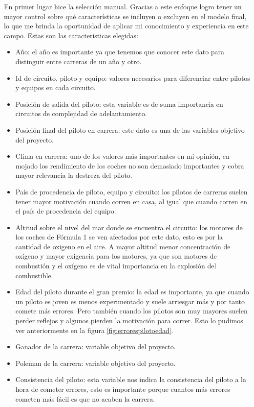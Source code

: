 En primer lugar hice la selección manual. Gracias a este enfoque logro tener un mayor control sobre qué características se incluyen o excluyen en el modelo final, lo que me brinda la oportunidad de aplicar mi conocimiento y experiencia en este campo. 
Estas son las características elegidas:

\begin{itemize}
    \item Año: el año es importante ya que tenemos que conocer este dato para distinguir entre carreras de un año y otro.
    \item Id de circuito, piloto y equipo: valores necesarios para diferenciar entre pilotos y equipos en cada circuito.
    \item Posición de salida del piloto: esta variable es de suma importancia en circuitos de complejidad de adelantamiento.
    \item Posición final del piloto en carrera: este dato es una de las variables objetivo del proyecto.
    \item Clima en carrera: uno de los valores más importantes en mi opinión, en mojado los rendimiento de los coches no son demasiado importantes y cobra mayor relevancia la destreza del piloto.
    \item País de procedencia de piloto, equipo y circuito: los pilotos de carreras suelen tener mayor motivación cuando corren en casa, al igual que cuando corren en el país de procedencia del equipo.
    \item Altitud sobre el nivel del mar donde se encuentra el circuito: los motores de los coches de Fórmula 1 se ven afectados por este dato, esto es por la cantidad de oxigeno en el aire. A mayor altitud menor concentración de oxígeno y mayor exigencia para los motores, ya que son motores de combustión y el oxígeno es de vital importancia en la explosión del combustible.
    \item Edad del piloto durante el gran premio: la edad es importante, ya que cuando un piloto es joven es menos experimentado y suele arriesgar más y por tanto comete más errores. Pero también cuando los pilotos son muy mayores suelen perder reflejos y algunos pierden la motivación para correr. Esto lo pudimos ver anteriormente en la figura \ref{fig:errorespilotoedad}.
    \item Ganador de la carrera: variable objetivo del proyecto.
    \item Poleman de la carrera: variable objetivo del proyecto.
    \item Consistencia del piloto: esta variable nos indica la consistencia del piloto a la hora de cometer errores, esto es importante porque cuantos más errores cometen más fácil es que no acaben la carrera.

\end{itemize}
